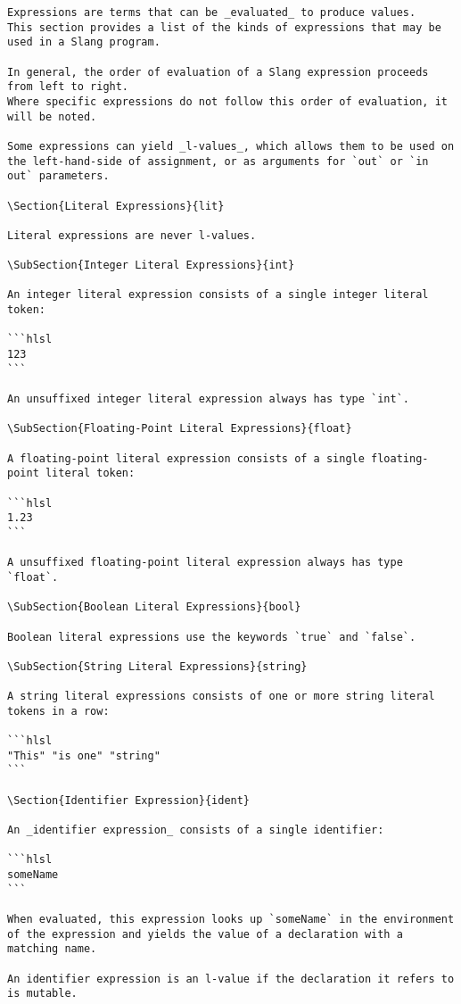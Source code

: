 
\begin{verbatim}
Expressions are terms that can be _evaluated_ to produce values.
This section provides a list of the kinds of expressions that may be used in a Slang program.

In general, the order of evaluation of a Slang expression proceeds from left to right.
Where specific expressions do not follow this order of evaluation, it will be noted.

Some expressions can yield _l-values_, which allows them to be used on the left-hand-side of assignment, or as arguments for `out` or `in out` parameters.

\Section{Literal Expressions}{lit}

Literal expressions are never l-values.

\SubSection{Integer Literal Expressions}{int}

An integer literal expression consists of a single integer literal token:

```hlsl
123
```

An unsuffixed integer literal expression always has type `int`.

\SubSection{Floating-Point Literal Expressions}{float}

A floating-point literal expression consists of a single floating-point literal token:

```hlsl
1.23
```

A unsuffixed floating-point literal expression always has type `float`.

\SubSection{Boolean Literal Expressions}{bool}

Boolean literal expressions use the keywords `true` and `false`.

\SubSection{String Literal Expressions}{string}

A string literal expressions consists of one or more string literal tokens in a row:

```hlsl
"This" "is one" "string"
```

\Section{Identifier Expression}{ident}

An _identifier expression_ consists of a single identifier:

```hlsl
someName
```

When evaluated, this expression looks up `someName` in the environment of the expression and yields the value of a declaration with a matching name.

An identifier expression is an l-value if the declaration it refers to is mutable.


\end{verbatim}
